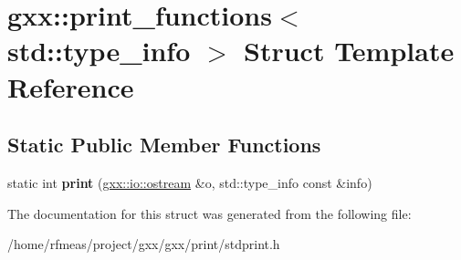 \hypertarget{structgxx_1_1print__functions_3_01std_1_1type__info_01_4}{}\section{gxx\+:\+:print\+\_\+functions$<$ std\+:\+:type\+\_\+info $>$ Struct Template Reference}
\label{structgxx_1_1print__functions_3_01std_1_1type__info_01_4}
\subsection*{Static Public Member Functions}
\begin{DoxyCompactItemize}
\item 
static int {\bfseries print} (\hyperlink{classgxx_1_1io_1_1ostream}{gxx\+::io\+::ostream} \&o, std\+::type\+\_\+info const \&info)\hypertarget{structgxx_1_1print__functions_3_01std_1_1type__info_01_4_a18dd92a34a5d4f1a7be95460b33b8705}{}\label{structgxx_1_1print__functions_3_01std_1_1type__info_01_4_a18dd92a34a5d4f1a7be95460b33b8705}

\end{DoxyCompactItemize}


The documentation for this struct was generated from the following file\+:\begin{DoxyCompactItemize}
\item 
/home/rfmeas/project/gxx/gxx/print/stdprint.\+h\end{DoxyCompactItemize}

